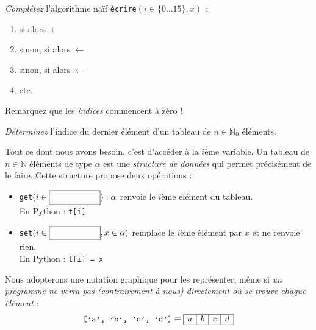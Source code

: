 \begin{exo}
\emph{Complétez} l'algorithme naïf \texttt{écrire}$(i\in\{0\dots15\}, x)$ :
\begin{enumerate}
\item si  alors
	 $\leftarrow$ 
\item sinon, si  alors
	 $\leftarrow$ 
\item sinon, si  alors
	 $\leftarrow$ 
\item etc.
\end{enumerate}
\end{exo}

Remarquez que les \emph{indices} commencent à zéro !
\begin{exo}
\emph{Déterminez} l'indice du dernier élément d'un tableau de
$n\in\mathbb{N}_0$ éléments.
\end{exo}

Tout ce dont nous avons besoin, c'est d'accéder à la $i$ème variable.
Un tableau de $n\in\mathbb{N}$ éléments de type $\alpha$ est une
\emph{structure de données} qui permet précisément de le faire.
Cette structure propose deux opérations :
\begin{itemize}
\item \texttt{get}$(i\in\pbox{$\{0\dots n-1\}$}) : \alpha$ renvoie le $i$ème
	élément du tableau. \\
	En Python : \texttt{t[i]}
\item \texttt{set}$(i\in\pbox{$\{0\dots n-1\}$}, x\in\alpha)$ remplace le
	$i$ème élément par $x$ et ne renvoie rien. \\
	En Python : \texttt{t[i] = x}
\end{itemize}

Nous adopterons une notation graphique pour les représenter, même si \emph{un
programme ne verra pas (contrairement à nous) directement où se trouve chaque
élément} :
\newcommand{\boxes}[4]{
	$\begin{array}{|l|l|l|l|}\hline
	\ptonly{#1} & \ptonly{#2} & \ptonly{#3} & \ptonly{#4} \\ \hline
	\end{array}$
}
\newcommand{\emptyboxes}{
	\boxes{\phantom{a}}{\phantom{a}}{\phantom{a}}{\phantom{a}}
}
\begin{equation*}
	\texttt{['a', 'b', 'c', 'd']} \equiv
	\begin{array}{|l|l|l|l|}\hline
		a & b & c & d \\ \hline
	\end{array}
\end{equation*}

